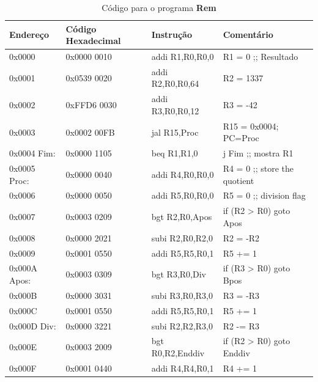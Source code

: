 \documentclass[12pt]{article}
\begin{document}
\begin{table}[H]
    \centering
    \caption{Código para o programa \textbf{Rem}}
    \begin{tabular}{|l|l|l|l|}\hline
        \textbf{Endereço} & \textbf{Código Hexadecimal} & \textbf{Instrução} & \textbf{Comentário} \\\hline
        0x0000         & 0x0000 0010 & addi R1,R0,R0,0      & R1 = 0 ;; Resultado          \\\hline
        0x0001         & 0x0539 0020 & addi R2,R0,R0,64     & R2 = 1337                    \\\hline
        0x0002         & 0xFFD6 0030 & addi R3,R0,R0,12     & R3 = -42                     \\\hline
        0x0003         & 0x0002 00FB & jal  R15,Proc        & R15 = 0x0004; PC=Proc        \\\hline
        0x0004 Fim:    & 0x0000 1105 & beq  R1,R1,0         & j Fim ;; mostra R1           \\\hline
        0x0005 Proc:   & 0x0000 0040 & addi R4,R0,R0,0      & R4 = 0 ;; store the quotient \\\hline
        0x0006         & 0x0000 0050 & addi R5,R0,R0,0      & R5 = 0 ;; division flag      \\\hline
        0x0007         & 0x0003 0209 & bgt  R2,R0,Apos      & if (R2 > R0) goto Apos       \\\hline
        0x0008         & 0x0000 2021 & subi R2,R0,R2,0      & R2 = -R2                     \\\hline
        0x0009         & 0x0001 0550 & addi R5,R5,R0,1      & R5 += 1                      \\\hline
        0x000A Apos:   & 0x0003 0309 & bgt  R3,R0,Div       & if (R3 > R0) goto Bpos       \\\hline
        0x000B         & 0x0000 3031 & subi R3,R0,R3,0      & R3 = -R3                     \\\hline
        0x000C         & 0x0001 0550 & addi R5,R5,R0,1      & R5 += 1                      \\\hline
        0x000D Div:    & 0x0000 3221 & subi R2,R2,R3,0      & R2 -= R3                     \\\hline
        0x000E         & 0x0003 2009 & bgt  R0,R2,Enddiv    & if (R2 > R0) goto Enddiv     \\\hline
        0x000F         & 0x0001 0440 & addi R4,R4,R0,1      & R4 += 1                      \\\hline

\end{tabular}
\end{table}
\end{document}
